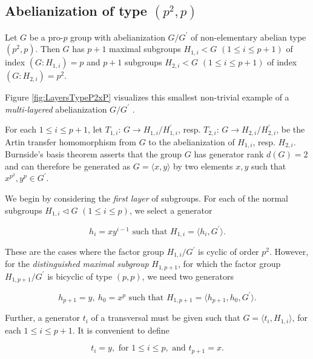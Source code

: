 \documentclass{amsart}
\theoremstyle{definition}
\numberwithin{equation}{section}
\begin{document}
\subsection{Abelianization of type \((p^2,p)\)}
\label{ss:TypePe2Pe}

Let \(G\) be a pro-\(p\) group with abelianization \(G/G^\prime\) of non-elementary abelian type \((p^2,p)\).
Then \(G\) has \(p+1\) maximal subgroups \(H_{1,i}<G\) \((1\le i\le p+1)\) of index \((G:H_{1,i})=p\)
and \(p+1\) subgroups \(H_{2,i}<G\) \((1\le i\le p+1)\) of index \((G:H_{2,i})=p^2\).

Figure
\ref{fig:LayersTypeP2xP}
visualizes this smallest non-trivial example of a \textit{multi-layered} abelianization \(G/G^\prime\)
\cite[Dfn.3.1--3, p.288]{Ma6}.

\noindent
For each \(1\le i\le p+1\), let \(T_{1,i}:\,G\to H_{1,i}/H_{1,i}^\prime\), resp. \(T_{2,i}:\,G\to H_{2,i}/H_{2,i}^\prime\),
be the Artin transfer homomorphism from \(G\) to the abelianization of \(H_{1,i}\), resp. \(H_{2,i}\).
Burnside's basis theorem asserts that the group \(G\) has generator rank \(d(G)=2\)
and can therefore be generated as \(G=\langle x,y\rangle\) by two elements \(x,y\)
such that \(x^{p^2},y^p\in G^\prime\).

We begin by considering the \textit{first layer} of subgroups.
For each of the normal subgroups \(H_{1,i}\triangleleft G\) \((1\le i\le p)\),
we select a generator

\begin{equation}
\label{eqn:GenLyr1P2xP}
h_i=xy^{i-1} \text{ such that } H_{1,i}=\langle h_i,G^\prime\rangle.
\end{equation}

\noindent
These are the cases where the factor group \(H_{1,i}/G^\prime\) is cyclic of order \(p^2\).
However, for the \textit{distinguished maximal subgroup} \(H_{1,p+1}\),
for which the factor group \(H_{1,p+1}/G^\prime\) is bicyclic of type \((p,p)\),
we need two generators

\begin{equation}
\label{eqn:GenLyr1VarP2xP}
h_{p+1}=y,\ h_0=x^p\text{ such that } H_{1,p+1}=\langle h_{p+1},h_0,G^\prime\rangle.
\end{equation}

\noindent
Further, a generator \(t_i\) of a transversal must be given
such that \(G=\langle t_i,H_{1,i}\rangle\), for each \(1\le i\le p+1\).
It is convenient to define

\begin{equation}
\label{eqn:TrvLyr1P2xP}
t_i=y, \text{ for } 1\le i\le p, \text{ and } t_{p+1}=x.
\end{equation}
\end{document}
